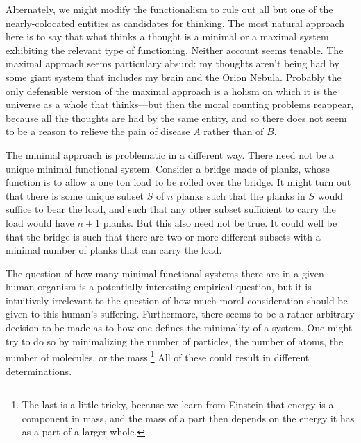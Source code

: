 Alternately, we might modify the functionalism to rule out all but one of the nearly-colocated entities as candidates for
thinking. The most natural approach here is to say that what thinks a thought is a minimal or a maximal system exhibiting 
the relevant type of functioning. Neither account seems tenable. The maximal approach seems particulary absurd: my thoughts aren't 
being had by some giant system that includes my brain and the Orion Nebula. Probably the only defensible version of the maximal
approach is a holism on which it is the universe as a whole that thinks---but then the moral counting problems reappear, because
all the thoughts are had by the same entity, and so there does not seem to be a reason to relieve the pain of disease $A$ rather 
than of $B$. 

The minimal approach is problematic in a different way. There need not be a unique minimal functional 
system. Consider a bridge made of planks, whose function is to allow a one ton load to be rolled over the bridge. 
It might turn out that there is some unique subset $S$ of $n$ planks such that the planks in $S$ would suffice to 
bear the load, and such that any other subset sufficient to carry the load would have $n+1$ planks. But this also 
need not be true. It could well be that the bridge is such that there are two or more different subsets with a 
minimal number of planks that can carry the load. 

The question of how many minimal functional systems there are in a given human organism is a potentially interesting
empirical question, but it is intuitively irrelevant to the question of how much moral consideration should be given 
to this human's suffering. Furthermore, there seems to be a rather arbitrary decision to be made as to how one 
defines the minimality of a system. One might try to do so by minimalizing the number of particles, the number of atoms, the number of 
molecules, or the mass.\footnote{The last is a little tricky, because we learn from Einstein that energy is a component in mass,
and the mass of a part then depends on the energy it has as a part of a larger whole.} All of these could result in 
different determinations.

